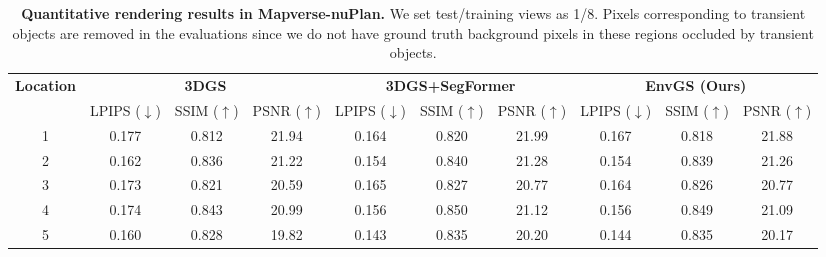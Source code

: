 \begin{table}[ht]
\scriptsize
\centering
\caption{\textbf{Quantitative rendering results in Mapverse-nuPlan.} We set test/training views as 1/8. Pixels corresponding to transient objects are removed in the evaluations since we do not have ground truth background pixels in these regions occluded by transient objects.}
\begin{tabular}{@{}c|ccc|ccc|ccc@{}}
\toprule
\multirow{2}{*}{\textbf{Location}} & \multicolumn{3}{c|}{\textbf{3DGS}}                                 & \multicolumn{3}{c|}{\textbf{3DGS+SegFormer}}                      & \multicolumn{3}{c}{\textbf{EnvGS (Ours)}}                                 \\ \cmidrule(l){2-10} 
                                   & \multicolumn{1}{c|}{LPIPS ($\downarrow$)} & \multicolumn{1}{c|}{SSIM ($\uparrow$)} & PSNR ($\uparrow$)      & \multicolumn{1}{c|}{LPIPS ($\downarrow$)} & \multicolumn{1}{c|}{SSIM ($\uparrow$)} & PSNR ($\uparrow$)     & \multicolumn{1}{c|}{LPIPS ($\downarrow$)}& \multicolumn{1}{c|}{SSIM ($\uparrow$)} & PSNR ($\uparrow$)      \\ \midrule
1                                  & 0.177                     & 0.812                     & 21.94     & 0.164                      & 0.820                     & 21.99    & 0.167                     & 0.818                     & 21.88     \\
2                                  & 0.162                     & 0.836                     & 21.22     & 0.154                      & 0.840                     & 21.28    & 0.154                     & 0.839                     & 21.26     \\
3                                  & 0.173                     & 0.821                     & 20.59     & 0.165                      & 0.827                     & 20.77    & 0.164                     & 0.826                     & 20.77     \\
4                                  & 0.174                     & 0.843                     & 20.99     & 0.156                      & 0.850                     & 21.12    & 0.156                     & 0.849                     & 21.09     \\
5                                  & 0.160                     & 0.828                     & 19.82     & 0.143                      & 0.835                     & 20.20    & 0.144                     & 0.835                     & 20.17     \\

\end{tabular}
\end{table}

